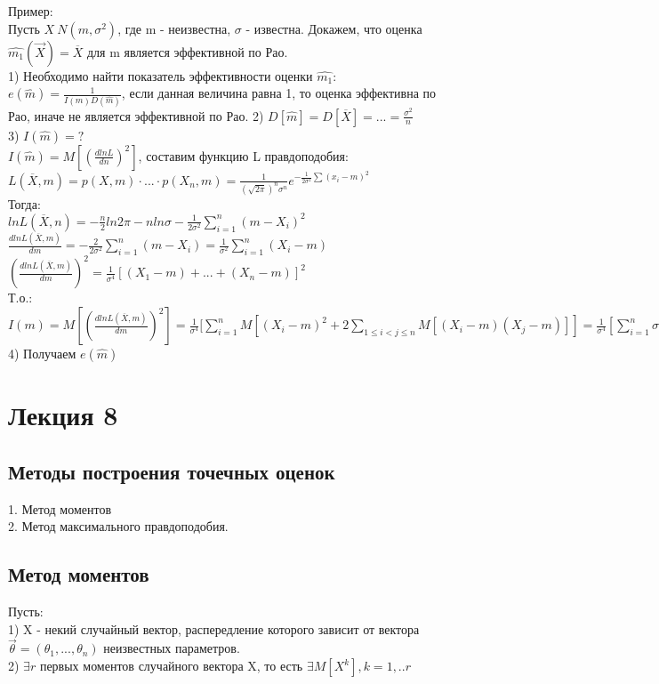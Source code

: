 Пример:\\
Пусть $X ~ N(m, \sigma^{2})$, где m - неизвестна, $\sigma$ - известна. Докажем, что оценка $\hat{m_{1}}(\overrightarrow{X}) = \overline{X}$ для m является эффективной по Рао.\\
1) Необходимо найти показатель эффективности оценки $\hat{m_{1}}$:\\
$e(\hat{m}) = \frac{1}{I(m)D(\hat{m})}$, если данная величина равна 1, то оценка эффективна по Рао, иначе не является эффективной по Рао.
2) $D[\hat{m}] = D[\overline{X}] = ... = \frac{\sigma^{2}}{n}$\\
3) $I(\hat{m}) = ?$\\
$I(\hat{m})=M[(\frac{d ln L}{dn})^{2}]$, составим функцию L правдоподобия:\\
$L(\overline{X}, m) = p(X, m)\cdot ... \cdot p(X_{n}, m) = \frac{1}{(\sqrt{2 \pi})^{n} \sigma^{n}}e^{-\frac{1}{2\sigma^{2}}\sum(x_{i}-m)^{2}}$\\
Тогда:\\
$ln L(\overline{X}, n) = -\frac{n}{2}ln 2\pi - n ln \sigma - \frac{1}{2\sigma^{2}}\sum_{i=1}^{n}(m - X_{i})^{2}$\\
$\frac{dln L(\overline{X}, m)}{dm} = -\frac{2}{2\sigma^{2}}\sum\limits_{i=1}^{n}(m - X_{i}) = \frac{1}{\sigma^{2}}\sum_{i=1}^{n}(X_{i} - m)$\\
$(\frac{dln L(\overline{X}, m)}{dm})^{2} = \frac{1}{\sigma^{4}}[(X_{1} - m) + ... + (X_{n} - m)]^{2}$\\
Т.о.:\\
$I(m) = M[(\frac{d ln L(\overline{X}, m)}{dm})^{2}] = \frac{1}{\sigma^{4}}[\sum\limits_{i=1}^{n}M[(X_{i} - m)^{2} + 2\sum\limits_{1 \leqslant i < j \leqslant n}M[(X_{i} - m)(X_{j} - m)]] = \frac{1}{\sigma^{4}}[\sum\limits_{i=1}^{n} \sigma^{2} + 0] = \frac{1}{\sigma^{4}} n\sigma^{2} = \frac{n}{\sigma^{2}}$\\
4) Получаем $e(\hat{m})$\\

\chapter{Лекция 8}
\section{Методы построения точечных оценок}
1. Метод моментов\\
2. Метод максимального правдоподобия.\\

\section{Метод моментов}
Пусть:\\
1) X - некий случайный вектор, распередление которого зависит от вектора $\overrightarrow{\theta} = (\theta_{1}, ..., \theta_{n})$ неизвестных параметров.\\
2) $\exists r $ первых моментов случайного вектора X, то есть $\exists M[X^{k}], k = 1,.. r$\\

